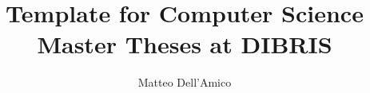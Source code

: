 \documentclass{masterthesis}
\begin{document}
\title{Template for Computer Science Master Theses at DIBRIS}

\author{Matteo Dell'Amico}



\maketitle

\tableofcontents













\printbibliography
% 
% 
\end{document}

